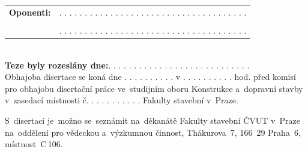 \documentclass[
    11pt, %
    english, %
    singlespacing, %
    headsepline, %
    chapterinoneline, %
    ]{MastersDoctoralThesis} %
\begin{document}
\noindent
\begin{tabular}{@{}l @{}l}
{\large\textbf{Oponenti: }} & {\large. . . . . . . . . . . . . . . . . . . . . . . . . . . . . . . . . . . . .} \\
&\\
& {\large. . . . . . . . . . . . . . . . . . . . . . . . . . . . . . . . . . . . .}
\end{tabular}\\[0.5cm]

\noindent
{\large\textbf{Teze byly rozeslány dne:}. . . . . . . . . . . . . . . . . . . . . . . . . . . .}\\[0.5cm]

\noindent
{\large Obhajoba disertace se koná dne . . . . . . . . . . v . . . . . . . . . . hod. před komisí pro obhajobu disertační práce ve~studijním oboru Konstrukce a~dopravní stavby v~zasedací místnosti č. . . . . . . . . . . Fakulty stavební v~Praze.}\\[0.5cm]

\vfill

\noindent
{\large S~disertací je~možno se~seznámit na~děkanátě Fakulty stavební ČVUT v~Praze na~oddělení pro vědeckou a~výzkumnou činnost, Thákurova~7, 166~29 Praha~6, místnost~C\,106.}\\[0.5cm]


\begin{abstract}
\addchaptertocentry{\abstractname} %



\noindent
\textbf{\keywordstitle} \keywordnames
\end{abstract}

\begingroup
\let\cleardoublepage\clearpage %

\begin{abstractcs}
\addchaptertocentry{\abstractnamecs} %



\noindent
\textbf{\keywordstitlecs} \keywordnamescs
\end{abstractcs}
\endgroup
\end{document}
